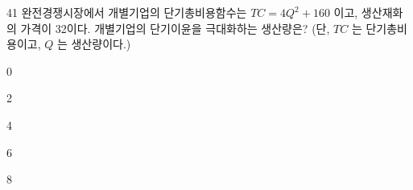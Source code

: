 \begin{question}{41}
완전경쟁시장에서 개별기업의 단기총비용함수는 $TC =4Q^{ 2 } +160$ 이고, 생산재화의 가격이 32이다. 개별기업의 단기이윤을 극대화하는 생산량은? (단, $TC$ 는 단기총비용이고, $Q$ 는 생산량이다.)
\begin{choices}
  \item 0
  \item 2
  \item 4
  \item 6
  \item 8
\end{choices}
\end{question}
